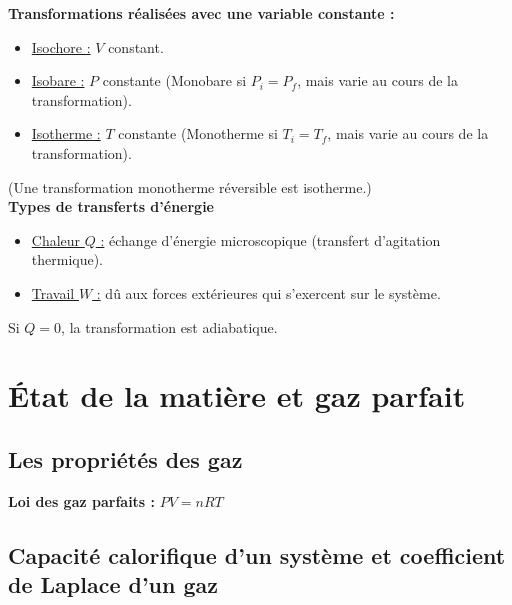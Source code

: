 \documentclass[13pt, twoside, a4paper, french]{report}
\begin{document}
            \textbf{Transformations réalisées avec une variable constante :}
            \vspace{5pt}
            \begin{itemize}
                \item \underline{Isochore :} $V$ constant.
                \item \underline{Isobare :} $P$ constante (Monobare si $P_i = P_f$, mais varie au cours de la transformation).
                \item \underline{Isotherme :} $T$ constante (Monotherme si $T_i = T_f$, mais varie au cours de la transformation).
            \end{itemize}
            \vspace{5pt}
            (Une transformation monotherme réversible est isotherme.)\\

            \textbf{Types de transferts d'énergie}
            \vspace{5pt}
            \begin{itemize}
                \item \underline{Chaleur $Q$ :} échange d'énergie microscopique (transfert d'agitation thermique).
                \item \underline{Travail $W$ :} dû aux forces extérieures qui s'exercent sur le système.
            \end{itemize}
            \vspace{5pt}
            Si $Q = 0$, la transformation est adiabatique.\\


\chapter{État de la matière et gaz parfait}\label{ch:etat-de-la-matiere-et-gaz-parfait}


    \section{Les propriétés des gaz}\label{sec:les-proprietes-des-gaz}

        \textbf{Loi des gaz parfaits :} $P V = n R T$


    \section{Capacité calorifique d’un système et coefficient de Laplace d’un gaz}\label{sec:capacite-calorifique-dun-systeme-et-coefficient-de-laplace-dun-gaz}
\end{document}

